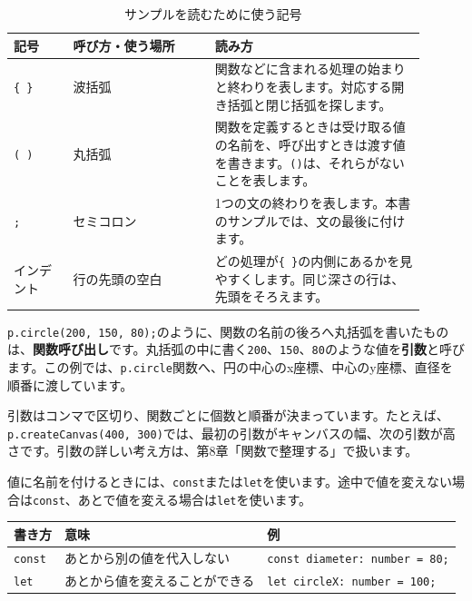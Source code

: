 \begin{table}[H]
    \centering
    \caption{サンプルを読むために使う記号}
    \label{tab:chapter02-javascript-symbols}
    \begin{tabular}{p{0.13\linewidth}p{0.31\linewidth}p{0.46\linewidth}}
        \toprule
        記号 & 呼び方・使う場所 & 読み方 \\
        \midrule
        \texttt{\{ \}}
            & 波括弧
            & 関数などに含まれる処理の始まりと終わりを表します。対応する開き括弧と閉じ括弧を探します。 \\
        \texttt{( )}
            & 丸括弧
            & 関数を定義するときは受け取る値の名前を、呼び出すときは渡す値を書きます。\texttt{()}は、それらがないことを表します。 \\
        \texttt{;}
            & セミコロン
            & 1つの文の終わりを表します。本書のサンプルでは、文の最後に付けます。 \\
        インデント
            & 行の先頭の空白
            & どの処理が\texttt{\{ \}}の内側にあるかを見やすくします。同じ深さの行は、先頭をそろえます。 \\
        \bottomrule
    \end{tabular}
\end{table}

\texttt{p.circle(200, 150, 80);}のように、関数の名前の後ろへ丸括弧を書いたものは、\textbf{関数呼び出し}です。丸括弧の中に書く\texttt{200}、\texttt{150}、\texttt{80}のような値を\textbf{引数}と呼びます。この例では、\texttt{p.circle}関数へ、円の中心のx座標、中心のy座標、直径を順番に渡しています。

引数はコンマで区切り、関数ごとに個数と順番が決まっています。たとえば、\texttt{p.createCanvas(400, 300)}では、最初の引数がキャンバスの幅、次の引数が高さです。引数の詳しい考え方は、第8章「関数で整理する」で扱います。

値に名前を付けるときには、\texttt{const}または\texttt{let}を使います。途中で値を変えない場合は\texttt{const}、あとで値を変える場合は\texttt{let}を使います。

\begin{center}
\begin{tabular}{lll}
    \toprule
    書き方 & 意味 & 例 \\
    \midrule
    \texttt{const} & あとから別の値を代入しない & \texttt{const diameter: number = 80;} \\
    \texttt{let} & あとから値を変えることができる & \texttt{let circleX: number = 100;} \\
    \bottomrule
\end{tabular}
\end{center}


